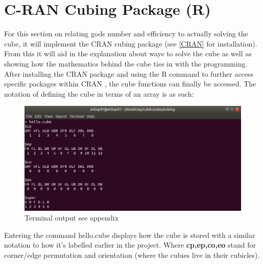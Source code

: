 \documentclass{article}
\newcounter{lem}[section]\setcounter{lem}{0}
\begin{document}
\newpage
\section{C-RAN Cubing Package (R)}

For this section on relating gods number and efficiency to actually solving the cube, it will implement the CRAN cubing package (see \ref{CRAN} for installation). From this it will
aid in the explanation about ways to solve the cube as well as showing how the mathematics behind the cube ties in with the programming.
After installing the CRAN package and using the R command to further access specific packages within CRAN , the cube functions can finally be accessed. The notation of defining the cube in terms of an array is as such:

\begin{figure}[h]
	\centering
	\includegraphics[scale=.5]{terminalcube.png}
	\caption{Terminal output see appendix}
\end{figure}
Entering the command hello.cube displays how the cube is stored with a similar notation to how it's labelled earlier in the project. Where \textbf{cp,ep,co,eo} stand for corner/edge permutation and orientation (where the cubies live in their cubicles).
\end{document}
